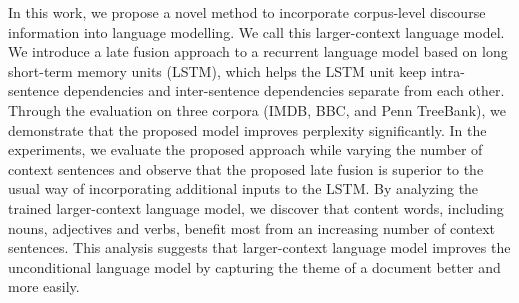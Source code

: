 In this work, we propose a novel method to incorporate corpus-level discourse information into language modelling. We call this larger-context language model. We introduce a late fusion approach to a recurrent language model based on long short-term memory units (LSTM), which helps the LSTM unit keep intra-sentence dependencies and inter-sentence dependencies separate from each other. Through the evaluation on three corpora (IMDB, BBC, and Penn TreeBank), we demonstrate that the proposed model improves perplexity significantly. In the experiments, we evaluate the proposed approach while varying the number of context sentences and observe that the proposed late fusion is superior to the usual way of incorporating additional inputs to the LSTM. By analyzing the trained larger-context language model, we discover that content words, including nouns, adjectives and verbs, benefit most from an increasing number of context sentences.  This analysis suggests that larger-context language model improves the unconditional language model by capturing the theme of a document better and more easily.
